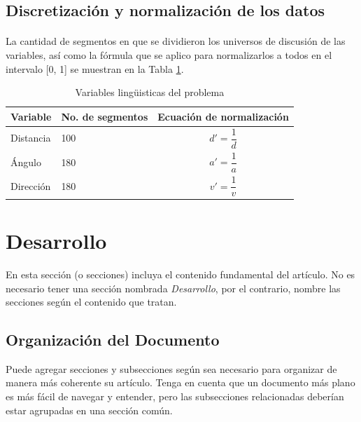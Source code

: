 \documentclass[a4paper,10pt,twocolumn]{article}
\begin{document}
\subsection{Discretización y normalización de los datos}\label{sub:discretization_and_normalization}
\paragraph{} La cantidad de segmentos en que se dividieron los universos de discusión de las variables, así como la fórmula que se aplico para
normalizarlos a todos en el intervalo [0, 1] se muestran en la Tabla \ref{tab:disc_norm}.

\begin{table}[htb]%
	\begin{center}
		 \begin{tabular}{| l | l | p{2.5cm} |}
			  \hline
			    Variable & No. de segmentos &  Ecuación de normalización \\ \hline
			    Distancia &  100 &  $$ d' = \frac{1}{d} $$ \\ \hline
			    Ángulo & 180 & $$ a' = \frac{1}{a} $$ \\ \hline
			    Dirección & 180 & $$ v' = \frac{1}{v} $$ \\ \hline
		  \end{tabular}		  
		  \caption{Variables lingüisticas del problema  \label{tab:disc_norm}}%
	\end{center}
\end{table}




\section{Desarrollo}\label{sec:dev}
  En esta sección (o secciones) incluya el contenido fundamental del artículo.
  No es necesario tener una sección nombrada \emph{Desarrollo}, por el contrario,
  nombre las secciones según el contenido que tratan.

	\subsection{Organización del Documento}\label{sub:results}
		Puede agregar secciones y subsecciones según sea necesario para organizar
		de manera más coherente su artículo. Tenga en cuenta que un documento más
		plano es más fácil de navegar y entender, pero las subsecciones relacionadas
		deberían estar agrupadas en una sección común.
\end{document}
